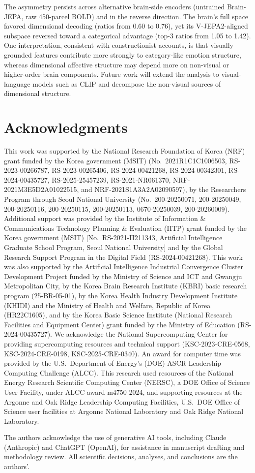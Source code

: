\documentclass[extended-abstract]{ccn}
\begin{document}
The asymmetry persists across alternative brain-side encoders (untrained Brain-JEPA, raw 450-parcel BOLD) and in the reverse direction.
The brain's full space favored dimensional decoding (ratios from 0.60 to 0.76), yet its V-JEPA2-aligned subspace reversed toward a categorical advantage (top-3 ratios from 1.05 to 1.42).
One interpretation, consistent with constructionist accounts, is that visually grounded features contribute more strongly to category-like emotion structure, whereas dimensional affective structure may depend more on non-visual or higher-order brain components.
Future work will extend the analysis to visual-language models such as CLIP \citep{Doerig2025} and decompose the non-visual sources of dimensional structure.

\section*{Acknowledgments}

This work was supported by the National Research Foundation of Korea (NRF) grant funded by the Korea government (MSIT) (No.\ 2021R1C1C1006503, RS-2023-00266787, RS-2023-00265406, RS-2024-00421268, RS-2024-00342301, RS-2024-00435727, RS-2025-25457239, RS-2021-NR061370, NRF-2021M3E5D2A01022515, and NRF-2021S1A3A2A02090597), by the Researchers Program through Seoul National University (No.\ 200-20250071, 200-20250049, 200-20250116, 200-20250115, 200-20250113, 0670-20250039, 200-20260009).
Additional support was provided by the Institute of Information \& Communications Technology Planning \& Evaluation (IITP) grant funded by the Korea government (MSIT) [No.\ RS-2021-II211343, Artificial Intelligence Graduate School Program, Seoul National University] and by the Global Research Support Program in the Digital Field (RS-2024-00421268).
This work was also supported by the Artificial Intelligence Industrial Convergence Cluster Development Project funded by the Ministry of Science and ICT and Gwangju Metropolitan City, by the Korea Brain Research Institute (KBRI) basic research program (25-BR-05-01), by the Korea Health Industry Development Institute (KHIDI) and the Ministry of Health and Welfare, Republic of Korea (HR22C1605), and by the Korea Basic Science Institute (National Research Facilities and Equipment Center) grant funded by the Ministry of Education (RS-2024-00435727).
We acknowledge the National Supercomputing Center for providing supercomputing resources and technical support (KSC-2023-CRE-0568, KSC-2024-CRE-0198, KSC-2025-CRE-0340).
An award for computer time was provided by the U.S.~Department of Energy's (DOE) ASCR Leadership Computing Challenge (ALCC).
This research used resources of the National Energy Research Scientific Computing Center (NERSC), a DOE Office of Science User Facility, under ALCC award m4750-2024, and supporting resources at the Argonne and Oak Ridge Leadership Computing Facilities, U.S.~DOE Office of Science user facilities at Argonne National Laboratory and Oak Ridge National Laboratory.

The authors acknowledge the use of generative AI tools, including Claude (Anthropic) and ChatGPT (OpenAI), for assistance in manuscript drafting and methodology review. All scientific decisions, analyses, and conclusions are the authors'.

\printbibliography
\end{document}
